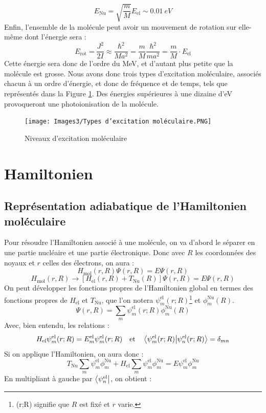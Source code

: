 \[
    E_\text{Nu} = \sqrt{\dfrac{m}{M}}E_\text{el} \sim \SI{0.01}{eV}
\]
Enfin, l'ensemble de la molécule peut avoir un mouvement de rotation sur elle-même dont l'énergie sera :
\[
    E_\text{rot} = \dfrac{J^2}{2I} \approx \dfrac{\hbar^2}{Ma^2} = \dfrac{m}{M}\dfrac{\hbar^2}{ma^2} = \dfrac{m}{M}\cdot E_\text{el}
\]
Cette énergie sera donc de l'ordre du \si{MeV}, et d'autant plus petite que la molécule est grosse. Nous avons donc trois types d'excitation moléculaire, associés chacun à un ordre d'énergie, et donc de fréquence et de temps, tels que représentés dans la Figure \ref{fig:niv_excitation_mol}. Des énergies supérieures à une dizaine d'\si{eV} provoqueront une photoionisation de la molécule.


\begin{figure}[htpb]
    \centering
    \texttt{[image: Images3/Types d'excitation moléculaire.PNG]}
    \caption{Niveaux d'excitation moléculaire}
    \label{fig:niv_excitation_mol}
\end{figure}



\section{Hamiltonien}
\subsection{Représentation adiabatique de l'Hamiltonien moléculaire}


Pour résoudre l'Hamiltonien associé à une molécule, on va d'abord le séparer en une partie nucléaire et une partie électronique. Donc avec $R$ les coordonnées des noyaux et $r$ celles des électrons, on aura :
\[
    H_\text{mol}(r,R)  \Psi(r,R) = E\Psi(r,R)
\]
\[
    H_\text{mol}(r,R) \to [H_\text{el}(r,R) + T_\text{Nu}(R)]\Psi(r,R) = E\Psi(r,R)
\]
On peut développer les fonctions propres de l'Hamiltonien global en termes des fonctions propres de $H_\text{el}$ et $T_\text{Nu}$, que l'on notera $\psi^\text{el}_m(r;R)$\footnote{(r;R) signifie que $R$ est fixé et $r$ varie.} et $\phi^\text{Nu}_m(R)$.
\[
    \Psi(r,R) = \sum\limits_m \psi^\text{el}_m(r;R) \phi^\text{Nu}_m(R)
\]
Avec, bien entendu, les relations :
\[
    H_\text{el}\psi^\text{el}_m(r;R) = E^\text{el}_m\psi^\text{el}_m(r;R) \quad \textrm{et} \quad \braket{\psi^\text{el}_m(r;R)}{\psi^\text{el}_n(r;R)} = \delta_{mn}
\]
Si on applique l'Hamiltonien, on aura donc :
\[
    T_\text{Nu} \sum\limits_m \psi^\text{el}_m \phi^\text{Nu}_m + H_\text{el}\sum\limits_m \psi^\text{el}_m \phi^\text{Nu}_m  = E\psi^\text{el}_m\phi^\text{Nu}_m
\]
En multipliant à gauche par $\bra{\psi^\text{el}_n}$, on obtient :

